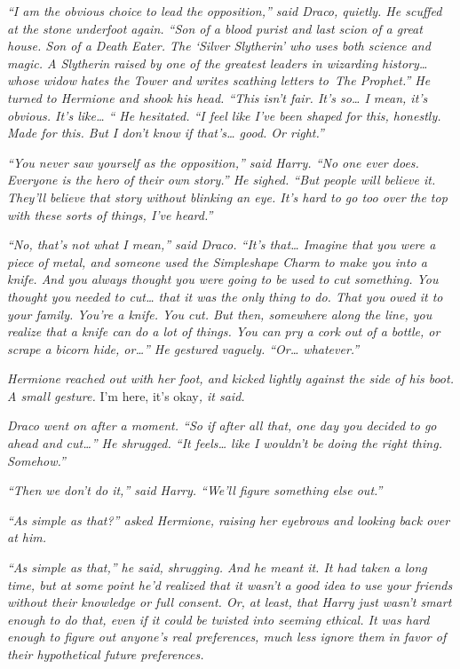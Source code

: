 \emph{``I am the obvious choice to lead the opposition,'' said Draco,
quietly. He scuffed at the stone underfoot again. ``Son of a blood
purist and last scion of a great house. Son of a Death Eater. The
`Silver Slytherin' who uses both science and magic. A Slytherin raised
by one of the greatest leaders in wizarding history\ldots{} whose widow
hates the Tower and writes scathing letters to\emph{~The Prophet}.'' He
turned to Hermione and shook his head. ``This isn't fair. It's
so\ldots{} I mean, it's obvious. It's like\ldots{} `` He hesitated. ``I
feel like I've been shaped for this, honestly. Made for this. But I
don't know if that's\ldots{} good. Or right.''}

\emph{``You never saw yourself as the opposition,'' said Harry. ``No one
ever does. Everyone is the hero of their own story.'' He sighed. ``But
people will believe it. They'll believe that story without blinking an
eye. It's hard to go too over the top with these sorts of things, I've
heard.''}

\emph{``No, that's not what I mean,'' said Draco. ``It's that\ldots{}
Imagine that you were a piece of metal, and someone used the Simpleshape
Charm to make you into a knife. And you always thought you were going to
be used to cut something. You thought you needed to cut\ldots{} that it
was the only thing to do. That you owed it to your family. You're a
knife. You cut. But then, somewhere along the line, you realize that a
knife can do a lot of things. You can pry a cork out of a bottle, or
scrape a bicorn hide, or\ldots{}'' He gestured vaguely. ``Or\ldots{}
whatever.''}

\emph{Hermione reached out with her foot, and kicked lightly against the
side of his boot. A small gesture.} I'm here, it's okay\emph{, it said.}

\emph{Draco went on after a moment. ``So if after all that, one day you
decided to go ahead and cut\ldots{}'' He shrugged. ``It feels\ldots{}
like I wouldn't be doing the right thing. Somehow.''}

\emph{``Then we don't do it,'' said Harry. ``We'll figure something else
out.''}

\emph{``As simple as that?'' asked Hermione, raising her eyebrows and
looking back over at him.}

\emph{``As simple as that,'' he said, shrugging. And he meant it. It had
taken a long time, but at some point he'd realized that it wasn't a good
idea to use your friends without their knowledge or full consent. Or, at
least, that Harry just wasn't smart enough to do that, even if it could
be twisted into seeming ethical. It was hard enough to figure out
anyone's real preferences, much less ignore them in favor of their
hypothetical future preferences.}

